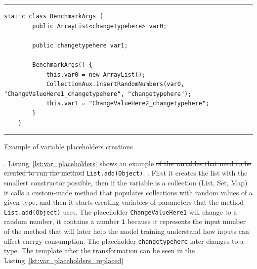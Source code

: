 \begin{listing}[H]
\noindent\rule{\linewidth}{0.4pt}
\begin{verbatim}
static class BenchmarkArgs {
        public ArrayList<changetypehere> var0;

        public changetypehere var1;

        BenchmarkArgs() {
            this.var0 = new ArrayList();
            CollectionAux.insertRandomNumbers(var0, "ChangeValueHere1_changetypehere", "changetypehere");
            this.var1 = "ChangeValueHere2_changetypehere";
        }
    }
\end{verbatim}
\noindent\rule{\linewidth}{0.4pt}
\caption{Example of variable placeholders creations}            
\label{lst:var_placeholders}
\end{listing}

. Listing~\ref{lst:var_placeholders} shows an example \st{of the variables that need to be created to run the method}  \texttt{List.add(Object)}. . First it creates the list with the smallest constructor possible, then if the variable is a collection (List, Set, Map) it calls a custom-made method that populates collections with random values of a given type, and then it starts creating variables of parameters that the method \texttt{List.add(Object)} uses. The placeholder \texttt{ChangeValueHere1} will change to a random number, it contains a number \texttt{1} because it represents the input number of the method that will later help the model training understand how inputs can affect energy consumption. The placeholder \texttt{changetypehere} later changes to a type. The template after the transformation can be seen in the Listing~\ref{lst:var_placeholders_replaced}



